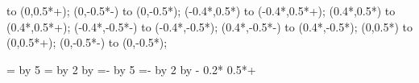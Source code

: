 {{\begin{scope}
                to (0,0.5*\morphismheight+\savedlengthn);
        \fi
        \ifconnectsf
             (0,-0.5*\morphismheight-\savedlengths)
                to (0,-0.5*\morphismheight);
        \fi
        \ifconnectnwr
             (-0.4*\overallwidth,0.5*\morphismheight)
                to (-0.4*\overallwidth,0.5*\morphismheight+\savedlengthnw);
        \fi
        \ifconnectner
             (0.4*\overallwidth,0.5*\morphismheight)
                to (0.4*\overallwidth,0.5*\morphismheight+\savedlengthne);
        \fi
        \ifconnectswr
             (-0.4*\overallwidth,-0.5*\morphismheight-\savedlengthsw)
                to (-0.4*\overallwidth,-0.5*\morphismheight);
        \fi
        \ifconnectser
             (0.4*\overallwidth,-0.5*\morphismheight-\savedlengthse)
                to (0.4*\overallwidth,-0.5*\morphismheight);
        \fi
        \ifconnectnr
             (0,0.5*\morphismheight)
                to (0,0.5*\morphismheight+\savedlengthn);
        \fi
        \ifconnectsr
             (0,-0.5*\morphismheight-\savedlengths)
                to (0,-0.5*\morphismheight);
        \fi
    \end{scope}
    }
}
{
    \savedanchor\centerpoint
    {
        \pgf@x=0pt
        \pgf@y=0pt
    }
    \anchorborder{\centerpoint}
    {
        \pgf@x=\minimummorphismwidth
        \divide\pgf@x by 5
        \pgf@y=\morphismheight
        \divide\pgf@y by 2
        \advance\pgf@y by \connectheight
    }
    {
        \pgf@x=-\minimummorphismwidth
        \divide\pgf@x by 5
        \pgf@y=-\morphismheight
        \divide\pgf@y by 2
        \advance\pgf@y by -\connectheight
    }
    \backgroundpath
    {
        \pgfsetlinewidth{\thickness}
        \pgfpathcurveto
            {}
            {}
            {\pgfpoint
                {0.2*\minimummorphismwidth}
                {0.5*\morphismheight+\connectheight}}
    }
}
